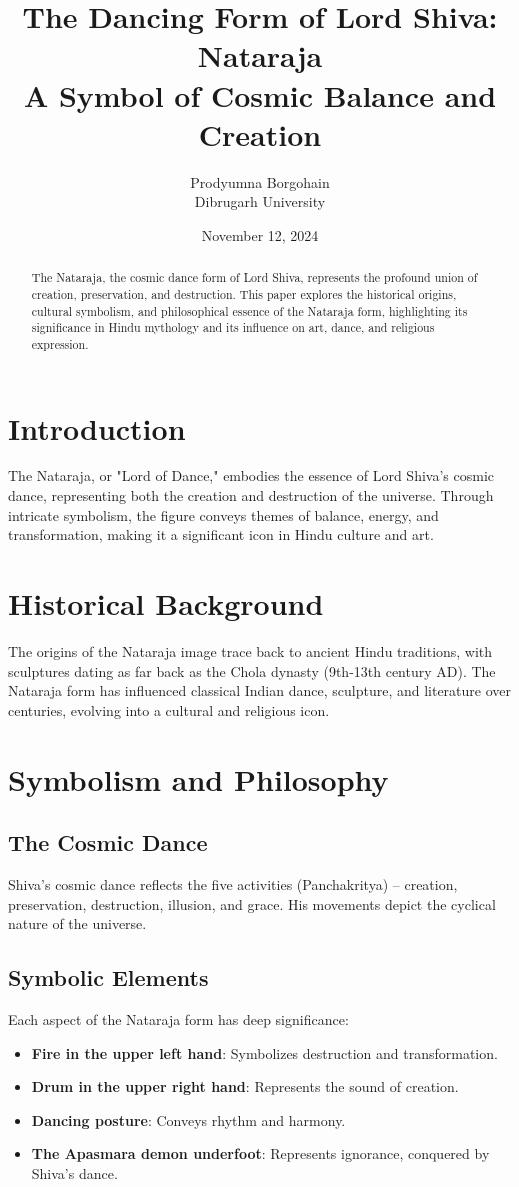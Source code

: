 \documentclass[a4paper,12pt]{article}
\title{\textbf{The Dancing Form of Lord Shiva: Nataraja \\ A Symbol of Cosmic Balance and Creation}}
\author{Prodyumna Borgohain \\ Dibrugarh University}
\date{November 12, 2024}
\begin{document}
\maketitle

\begin{abstract}
The Nataraja, the cosmic dance form of Lord Shiva, represents the profound union of creation, preservation, and destruction. This paper explores the historical origins, cultural symbolism, and philosophical essence of the Nataraja form, highlighting its significance in Hindu mythology and its influence on art, dance, and religious expression.
\end{abstract}

\section{Introduction}
The Nataraja, or "Lord of Dance," embodies the essence of Lord Shiva’s cosmic dance, representing both the creation and destruction of the universe. Through intricate symbolism, the figure conveys themes of balance, energy, and transformation, making it a significant icon in Hindu culture and art.

\section{Historical Background}
The origins of the Nataraja image trace back to ancient Hindu traditions, with sculptures dating as far back as the Chola dynasty (9th-13th century AD). The Nataraja form has influenced classical Indian dance, sculpture, and literature over centuries, evolving into a cultural and religious icon.

\section{Symbolism and Philosophy}
\subsection{The Cosmic Dance}
Shiva’s cosmic dance reflects the five activities (Panchakritya) – creation, preservation, destruction, illusion, and grace. His movements depict the cyclical nature of the universe.

\subsection{Symbolic Elements}
Each aspect of the Nataraja form has deep significance:
\begin{itemize}
    \item \textbf{Fire in the upper left hand}: Symbolizes destruction and transformation.
    \item \textbf{Drum in the upper right hand}: Represents the sound of creation.
    \item \textbf{Dancing posture}: Conveys rhythm and harmony.
    \item \textbf{The Apasmara demon underfoot}: Represents ignorance, conquered by Shiva’s dance.
\end{itemize}
\end{document}
